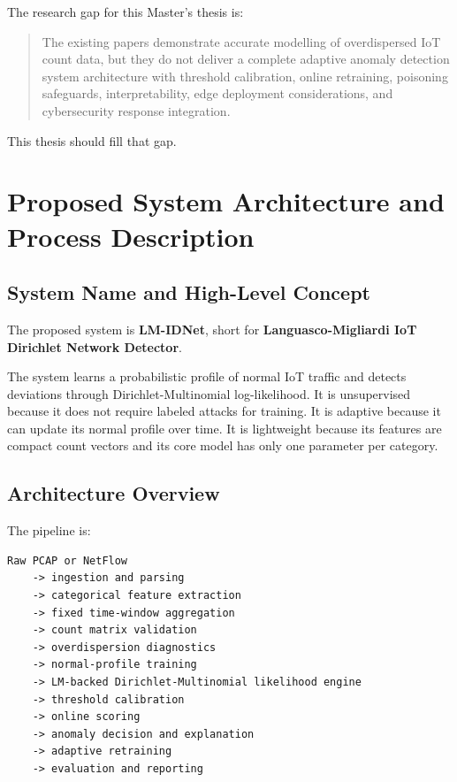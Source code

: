 \documentclass[11pt,a4paper]{article}
\begin{document}
The research gap for this Master's thesis is:

\begin{quote}
The existing papers demonstrate accurate modelling of overdispersed IoT count data, but they do not deliver a complete adaptive anomaly detection system architecture with threshold calibration, online retraining, poisoning safeguards, interpretability, edge deployment considerations, and cybersecurity response integration.
\end{quote}

This thesis should fill that gap.

\section{Proposed System Architecture and Process Description}

\subsection{System Name and High-Level Concept}

The proposed system is \textbf{LM-IDNet}, short for \textbf{Languasco-Migliardi IoT Dirichlet Network Detector}.

The system learns a probabilistic profile of normal IoT traffic and detects deviations through Dirichlet-Multinomial log-likelihood. It is unsupervised because it does not require labeled attacks for training. It is adaptive because it can update its normal profile over time. It is lightweight because its features are compact count vectors and its core model has only one parameter per category.

\subsection{Architecture Overview}

The pipeline is:

\begin{lstlisting}
Raw PCAP or NetFlow
    -> ingestion and parsing
    -> categorical feature extraction
    -> fixed time-window aggregation
    -> count matrix validation
    -> overdispersion diagnostics
    -> normal-profile training
    -> LM-backed Dirichlet-Multinomial likelihood engine
    -> threshold calibration
    -> online scoring
    -> anomaly decision and explanation
    -> adaptive retraining
    -> evaluation and reporting
\end{lstlisting}
\end{document}
